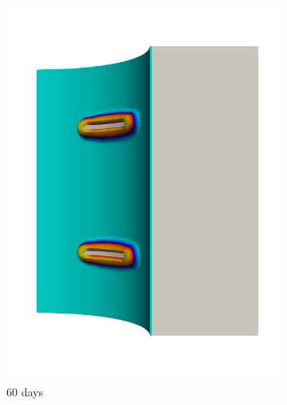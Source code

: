 \begin{figure}[!htb]
\begin{subfigure}[b]{0.2\textwidth}
    \includegraphics[width=\textwidth]{Chapter5/figures/spallation/seed_c_2}
    \caption{60 days}
  \end{subfigure}
  \begin{subfigure}[b]{0.2\textwidth}
    \centering

\end{subfigure}
\end{figure}
